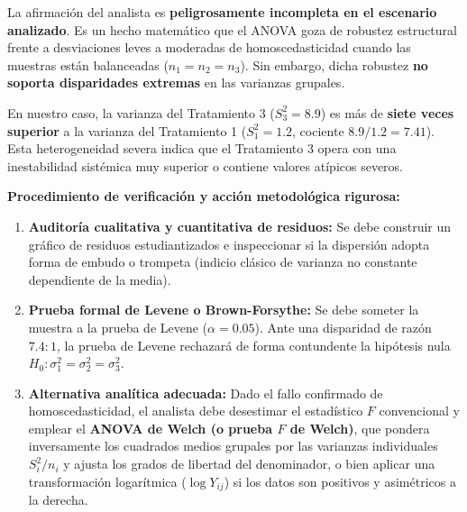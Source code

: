 \begin{solproblema}
	La afirmación del analista es \textbf{peligrosamente incompleta en el escenario analizado}. Es un hecho matemático que el ANOVA goza de robustez estructural frente a desviaciones leves a moderadas de homoscedasticidad cuando las muestras están balanceadas ($n_1 = n_2 = n_3$). Sin embargo, dicha robustez \textbf{no soporta disparidades extremas} en las varianzas grupales.
	
	En nuestro caso, la varianza del Tratamiento 3 ($S_3^2 = 8.9$) es más de \textbf{siete veces superior} a la varianza del Tratamiento 1 ($S_1^2 = 1.2$, cociente $8.9 / 1.2 = 7.41$). Esta heterogeneidad severa indica que el Tratamiento 3 opera con una inestabilidad sistémica muy superior o contiene valores atípicos severos.
	
	\textbf{Procedimiento de verificación y acción metodológica rigurosa:}
	\begin{enumerate}
		\item \textbf{Auditoría cualitativa y cuantitativa de residuos:} Se debe construir un gráfico de residuos estudiantizados e inspeccionar si la dispersión adopta forma de embudo o trompeta (indicio clásico de varianza no constante dependiente de la media).
		\item \textbf{Prueba formal de Levene o Brown-Forsythe:} Se debe someter la muestra a la prueba de Levene ($\alpha = 0.05$). Ante una disparidad de razón $7.4:1$, la prueba de Levene rechazará de forma contundente la hipótesis nula $H_0: \sigma_1^2 = \sigma_2^2 = \sigma_3^2$.
		\item \textbf{Alternativa analítica adecuada:} Dado el fallo confirmado de homoscedasticidad, el analista debe desestimar el estadístico $F$ convencional y emplear el \textbf{ANOVA de Welch (o prueba $F$ de Welch)}, que pondera inversamente los cuadrados medios grupales por las varianzas individuales $S_i^2/n_i$ y ajusta los grados de libertad del denominador, o bien aplicar una transformación logarítmica ($\log Y_{ij}$) si los datos son positivos y asimétricos a la derecha.
	\end{enumerate}
\end{solproblema}

